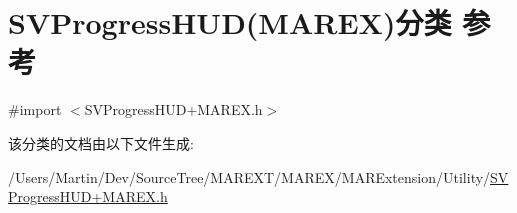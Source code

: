 \hypertarget{category_s_v_progress_h_u_d_07_m_a_r_e_x_08}{}\section{S\+V\+Progress\+H\+UD(M\+A\+R\+EX)分类 参考}
\label{category_s_v_progress_h_u_d_07_m_a_r_e_x_08}


{\ttfamily \#import $<$S\+V\+Progress\+H\+U\+D+\+M\+A\+R\+E\+X.\+h$>$}



该分类的文档由以下文件生成\+:\begin{DoxyCompactItemize}
\item 
/\+Users/\+Martin/\+Dev/\+Source\+Tree/\+M\+A\+R\+E\+X\+T/\+M\+A\+R\+E\+X/\+M\+A\+R\+Extension/\+Utility/\hyperlink{_s_v_progress_h_u_d_09_m_a_r_e_x_8h}{S\+V\+Progress\+H\+U\+D+\+M\+A\+R\+E\+X.\+h}\end{DoxyCompactItemize}
